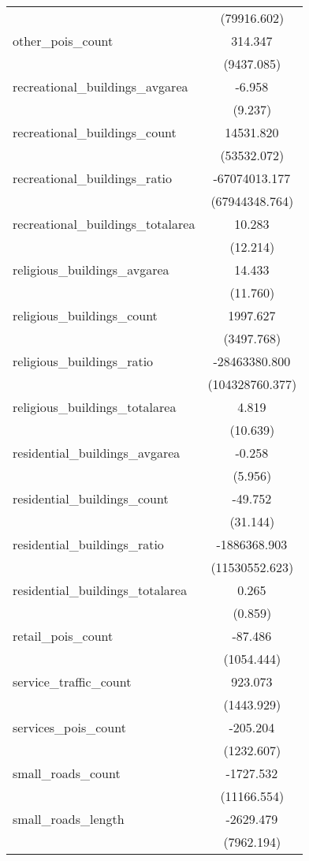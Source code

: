\begin{table}[!htbp]
\begin{tabular}{@{\extracolsep{5pt}}lc}
  & (79916.602) \\
 other_pois_count & 314.347$^{}$ \\
  & (9437.085) \\
 recreational_buildings_avgarea & -6.958$^{}$ \\
  & (9.237) \\
 recreational_buildings_count & 14531.820$^{}$ \\
  & (53532.072) \\
 recreational_buildings_ratio & -67074013.177$^{}$ \\
  & (67944348.764) \\
 recreational_buildings_totalarea & 10.283$^{}$ \\
  & (12.214) \\
 religious_buildings_avgarea & 14.433$^{}$ \\
  & (11.760) \\
 religious_buildings_count & 1997.627$^{}$ \\
  & (3497.768) \\
 religious_buildings_ratio & -28463380.800$^{}$ \\
  & (104328760.377) \\
 religious_buildings_totalarea & 4.819$^{}$ \\
  & (10.639) \\
 residential_buildings_avgarea & -0.258$^{}$ \\
  & (5.956) \\
 residential_buildings_count & -49.752$^{}$ \\
  & (31.144) \\
 residential_buildings_ratio & -1886368.903$^{}$ \\
  & (11530552.623) \\
 residential_buildings_totalarea & 0.265$^{}$ \\
  & (0.859) \\
 retail_pois_count & -87.486$^{}$ \\
  & (1054.444) \\
 service_traffic_count & 923.073$^{}$ \\
  & (1443.929) \\
 services_pois_count & -205.204$^{}$ \\
  & (1232.607) \\
 small_roads_count & -1727.532$^{}$ \\
  & (11166.554) \\
 small_roads_length & -2629.479$^{}$ \\
  & (7962.194) \\

\end{tabular}
\end{table}
